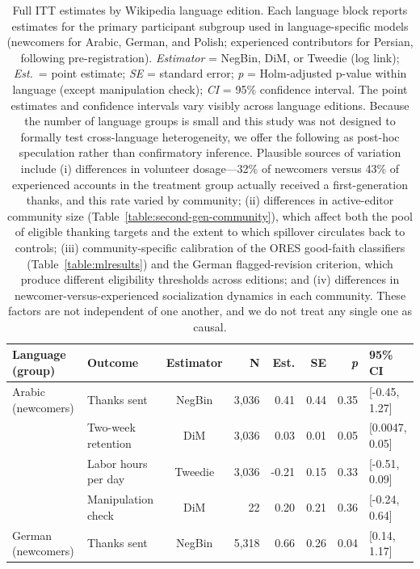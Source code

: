 \begin{table}[ht]
\centering
\small
\caption{Full ITT estimates by Wikipedia language edition. Each language block reports estimates for the primary participant subgroup used in language-specific models (newcomers for Arabic, German, and Polish; experienced contributors for Persian, following pre-registration). \textit{Estimator} = NegBin, DiM, or Tweedie (log link); \textit{Est.}\ = point estimate; \textit{SE} = standard error; \textit{p} = Holm-adjusted p-value within language (except manipulation check); \textit{CI} = 95\% confidence interval. The point estimates and confidence intervals vary visibly across language editions. Because the number of language groups is small and this study was not designed to formally test cross-language heterogeneity, we offer the following as post-hoc speculation rather than confirmatory inference. Plausible sources of variation include (i) differences in volunteer dosage---32\% of newcomers versus 43\% of experienced accounts in the treatment group actually received a first-generation thanks, and this rate varied by community; (ii) differences in active-editor community size (Table~\ref{table:second-gen-community}), which affect both the pool of eligible thanking targets and the extent to which spillover circulates back to controls; (iii) community-specific calibration of the ORES good-faith classifiers (Table~\ref{table:mlresults}) and the German flagged-revision criterion, which produce different eligibility thresholds across editions; and (iv) differences in newcomer-versus-experienced socialization dynamics in each community. These factors are not independent of one another, and we do not treat any single one as causal.}
\label{table:full_itt_language}
\begin{tabular}{llcrrrrl}
\toprule
\textbf{Language (group)} & \textbf{Outcome} & \textbf{Estimator} & \textbf{N} & \textbf{Est.} & \textbf{SE} & \textbf{\textit{p}} & \textbf{95\% CI} \\
\midrule
Arabic (newcomers) & Thanks sent & NegBin & 3,036 & 0.41 & 0.44 & 0.35 & [-0.45, 1.27] \\
 & Two-week retention & DiM & 3,036 & 0.03 & 0.01 & 0.05 & [0.0047, 0.05] \\
 & Labor hours per day & Tweedie & 3,036 & -0.21 & 0.15 & 0.33 & [-0.51, 0.09] \\
 & Manipulation check & DiM & 22 & 0.20 & 0.21 & 0.36 & [-0.24, 0.64] \\
\addlinespace
German (newcomers) & Thanks sent & NegBin & 5,318 & 0.66 & 0.26 & 0.04 & [0.14, 1.17] \\

\end{tabular}
\end{table}
